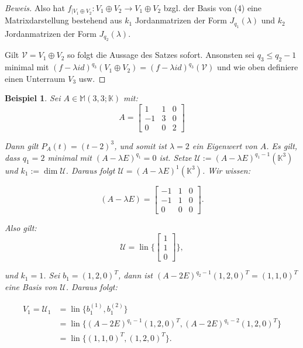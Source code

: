 \documentclass{article}
\newtheorem*{example}{Beispiel}
\newcommand{\V}{\mathcal{V}}
\newcommand{\U}{\mathcal{U}}
\newcommand{\K}{\mathbb{K}}
\newcommand{\M}{\mathbb{M}}
\newcommand{\basis}[2]{b_{#1}^{({#2})}}
\newcommand{\lam}{\lambda}
\newcommand{\flam}[1]{(f-{\lambda}id)^{{#1}}}
\newcommand{\funcdown}[2]{{{#1}}_{|{#2}}\colon{#2}\to{#2}}
\DeclareMathOperator{\lin}{lin}
\begin{document}
\begin{proof}[Beweis]
  Also hat $\funcdown{f}{V_1 \oplus V_2}$ bzgl. der Basis von (4) eine Matrixdarstellung
  bestehend aus $k_1$ Jordanmatrizen der Form $J_{q_1}(\lam)$ und $k_2$ Jordanmatrizen der Form
  $J_{q_2}(\lam)$.

  Gilt $\V = V_1 \oplus V_2$ so folgt die Aussage des Satzes sofort. Ansonsten sei $q_3 \le q_2-1$ minimal mit $\flam{q_3}(V_1 \oplus V_2) = \flam{q_3}(\V)$ und wie oben definiere
  einen Unterraum $V_3$ usw.
  
\end{proof}


\begin{example}
  Sei $A \in \M (3,3;\K)$ mit:
  \begin{equation*}
    A =
    \begin{bmatrix}
      1  & 1 & 0 \\
      -1 & 3 & 0 \\
      0  & 0 & 2 
    \end{bmatrix}
  \end{equation*}

  Dann gilt $P_A(t)=(t-2)^3$, und somit ist $\lam = 2$ ein Eigenwert von $A$. Es gilt, dass
  $q_1 = 2$ minimal mit $(A-\lam E)^{q_1}=0$ ist. Setze $\U := (A - \lam E)^{q_1-1}(\K^3)$ und
  $k_1 := \dim \U$. Daraus folgt $\U = (A - \lam E)^1(\K^3)$. Wir wissen:

  \begin{equation*}
    (A - \lam E) =
    \begin{bmatrix}
      -1 & 1 & 0 \\
      -1 & 1 & 0 \\
      0  & 0 & 0 
    \end{bmatrix}.
  \end{equation*}

  Also gilt:
  \begin{equation*}
    \U = \lin \{
    \begin{bmatrix}
      1 \\
      1 \\
      0  
    \end{bmatrix}
    \},
  \end{equation*}

  und $k_1 = 1$. Sei $b_1 = (1, 2, 0)^T$, dann ist $(A-2E)^{q_2-1}(1, 2, 0)^T = (1, 1, 0)^T$
  eine Basis von $\U$.
  Daraus folgt:

  \begin{align*}
    V_1 = \U_1 &= \lin \{\basis{1}{1}, \basis{1}{2}\} \\
               &= \lin \{ (A-2E)^{q_1-1}(1,2,0)^T, (A-2E)^{q_1-2}(1,2,0)^T\} \\ 
               &= \lin \{(1, 1, 0)^T, (1, 2, 0)^T\}.
  \end{align*}


\end{example}
\end{document}
